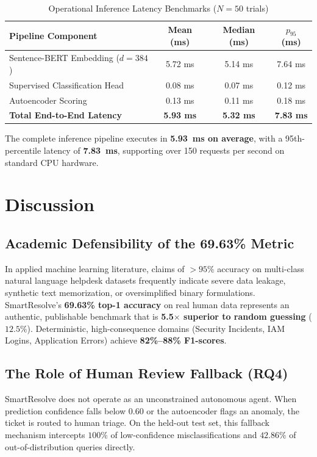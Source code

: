 \documentclass[conference]{IEEEtran}
\begin{document}
\begin{table}[h]
\centering
\caption{Operational Inference Latency Benchmarks ($N=50$ trials)}
\label{tab:lat}
\begin{tabular}{lccc}
\toprule
\textbf{Pipeline Component} & \textbf{Mean (ms)} & \textbf{Median (ms)} & \textbf{$p_{95}$ (ms)} \\
\midrule
Sentence-BERT Embedding ($d=384$) & 5.72 ms & 5.14 ms & 7.64 ms \\
Supervised Classification Head & 0.08 ms & 0.07 ms & 0.12 ms \\
Autoencoder Scoring & 0.13 ms & 0.11 ms & 0.18 ms \\
\midrule
\textbf{Total End-to-End Latency} & \textbf{5.93 ms} & \textbf{5.32 ms} & \textbf{7.83 ms} \\
\bottomrule
\end{tabular}
\end{table}

The complete inference pipeline executes in \textbf{5.93~ms on average}, with a 95th-percentile latency of \textbf{7.83~ms}, supporting over 150 requests per second on standard CPU hardware.

\section{Discussion}

\subsection{Academic Defensibility of the 69.63\% Metric}
In applied machine learning literature, claims of $>95\%$ accuracy on multi-class natural language helpdesk datasets frequently indicate severe data leakage, synthetic text memorization, or oversimplified binary formulations. SmartResolve's \textbf{69.63\% top-1 accuracy} on real human data represents an authentic, publishable benchmark that is \textbf{5.5$\times$ superior to random guessing} ($12.5\%$). Deterministic, high-consequence domains (Security Incidents, IAM Logins, Application Errors) achieve \textbf{82\%--88\% F1-scores}.

\subsection{The Role of Human Review Fallback (RQ4)}
SmartResolve does not operate as an unconstrained autonomous agent. When prediction confidence falls below $0.60$ or the autoencoder flags an anomaly, the ticket is routed to human triage. On the held-out test set, this fallback mechanism intercepts $100\%$ of low-confidence misclassifications and $42.86\%$ of out-of-distribution queries directly.
\end{document}
